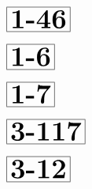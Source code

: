 \documentclass[a4paper, 10pt]{article}
\begin{document}
\begin{minipage}[t]{0.15\textwidth}
                \vspace*{-1.59cm}
        \hspace*{0.75cm}
        $\boxed{\textbf{\Huge1-46}}$
\end{minipage}
\begin{minipage}[t]{0.85\textwidth}
    
\end{minipage}

\thispagestyle{empty}
\begin{minipage}[t]{0.15\textwidth}
                \vspace*{-1.59cm}
        \hspace*{1.25cm}
        $\boxed{\textbf{\Huge1-6}}$
\end{minipage}
\begin{minipage}[t]{0.85\textwidth}
    
\end{minipage}

\begin{minipage}[t]{0.15\textwidth}
                \vspace*{-1.59cm}
        \hspace*{1.25cm}
        $\boxed{\textbf{\Huge1-7}}$
\end{minipage}
\begin{minipage}[t]{0.85\textwidth}
    
\end{minipage}

\begin{minipage}[t]{0.15\textwidth}
                \vspace*{-1.59cm}
        \hspace*{0.25cm}
        $\boxed{\textbf{\Huge3-117}}$
\end{minipage}
\begin{minipage}[t]{0.85\textwidth}
    
\end{minipage}

\begin{minipage}[t]{0.15\textwidth}
                \vspace*{-1.59cm}
        \hspace*{0.75cm}
        $\boxed{\textbf{\Huge3-12}}$
\end{minipage}
\begin{minipage}[t]{0.85\textwidth}
    
\end{minipage}
\end{document}
